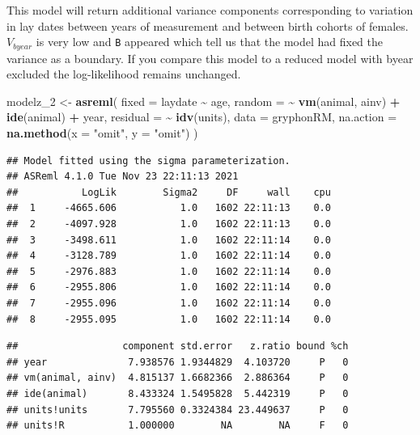\documentclass[
  12pt,
]{book}
\newenvironment{Shaded}{\begin{snugshade}}{\end{snugshade}}
\newcommand{\DataTypeTok}[1]{\textcolor[rgb]{0.13,0.29,0.53}{#1}}
\newcommand{\DecValTok}[1]{\textcolor[rgb]{0.00,0.00,0.81}{#1}}
\newcommand{\KeywordTok}[1]{\textcolor[rgb]{0.13,0.29,0.53}{\textbf{#1}}}
\newcommand{\NormalTok}[1]{#1}
\newcommand{\OperatorTok}[1]{\textcolor[rgb]{0.81,0.36,0.00}{\textbf{#1}}}
\newcommand{\StringTok}[1]{\textcolor[rgb]{0.31,0.60,0.02}{#1}}
\begin{document}
This model will return additional variance components corresponding to variation in lay dates between years of measurement and between birth cohorts of females. \(V_{byear}\) is very low and \texttt{B} appeared which tell us that the model had fixed the variance as a boundary. If you compare this model to a reduced model with byear excluded the log-likelihood remains unchanged.

\begin{Shaded}
\begin{Highlighting}[]
\NormalTok{modelz\_}\DecValTok{2}\NormalTok{ \textless{}{-}}\StringTok{ }\KeywordTok{asreml}\NormalTok{(}
  \DataTypeTok{fixed =}\NormalTok{ laydate }\OperatorTok{\textasciitilde{}}\StringTok{ }\NormalTok{age,}
  \DataTypeTok{random =} \OperatorTok{\textasciitilde{}}\StringTok{ }\KeywordTok{vm}\NormalTok{(animal, ainv) }\OperatorTok{+}\StringTok{ }\KeywordTok{ide}\NormalTok{(animal) }\OperatorTok{+}
\StringTok{    }\NormalTok{year,}
  \DataTypeTok{residual =} \OperatorTok{\textasciitilde{}}\StringTok{ }\KeywordTok{idv}\NormalTok{(units),}
  \DataTypeTok{data =}\NormalTok{ gryphonRM,}
  \DataTypeTok{na.action =} \KeywordTok{na.method}\NormalTok{(}\DataTypeTok{x =} \StringTok{"omit"}\NormalTok{, }\DataTypeTok{y =} \StringTok{"omit"}\NormalTok{)}
\NormalTok{)}
\end{Highlighting}
\end{Shaded}

\begin{verbatim}
## Model fitted using the sigma parameterization.
## ASReml 4.1.0 Tue Nov 23 22:11:13 2021
##           LogLik        Sigma2     DF     wall    cpu
##  1     -4665.606           1.0   1602 22:11:13    0.0
##  2     -4097.928           1.0   1602 22:11:13    0.0
##  3     -3498.611           1.0   1602 22:11:14    0.0
##  4     -3128.789           1.0   1602 22:11:14    0.0
##  5     -2976.883           1.0   1602 22:11:14    0.0
##  6     -2955.806           1.0   1602 22:11:14    0.0
##  7     -2955.096           1.0   1602 22:11:14    0.0
##  8     -2955.095           1.0   1602 22:11:14    0.0
\end{verbatim}

\begin{Shaded}
\end{Shaded}

\begin{verbatim}
##                  component std.error   z.ratio bound %ch
## year              7.938576 1.9344829  4.103720     P   0
## vm(animal, ainv)  4.815137 1.6682366  2.886364     P   0
## ide(animal)       8.433324 1.5495828  5.442319     P   0
## units!units       7.795560 0.3324384 23.449637     P   0
## units!R           1.000000        NA        NA     F   0
\end{verbatim}
\end{document}
